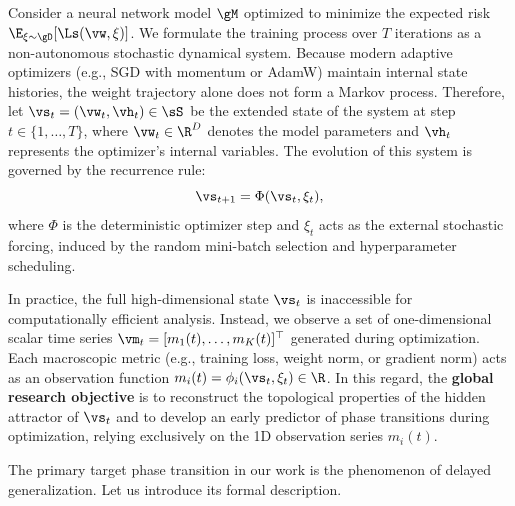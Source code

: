 \documentclass{article}
\begin{document}
Consider a neural network model $\gM$ optimized to minimize the expected risk $\E_{\xi \sim \gD}[\Ls(\vw, \xi)]$. We formulate the training process over $T$ iterations as a non-autonomous stochastic dynamical system. Because modern adaptive optimizers (e.g., SGD with momentum or AdamW) maintain internal state histories, the weight trajectory alone does not form a Markov process. Therefore, let $\vs_t = (\vw_t, \vh_t) \in \sS$ be the extended state of the system at step $t \in \{1, \dots, T\}$, where $\vw_t \in \R^D$ denotes the model parameters and $\vh_t$ represents the optimizer's internal variables. The evolution of this system is governed by the recurrence rule:
\begin{equation}
    \vs_{t+1} = \Phi(\vs_t, \xi_t),
\end{equation}
where $\Phi$ is the deterministic optimizer step and $\xi_t$ acts as the external stochastic forcing, induced by the random mini-batch selection and hyperparameter scheduling.

In practice, the full high-dimensional state $\vs_t$ is inaccessible for computationally efficient analysis. Instead, we observe a set of one-dimensional scalar time series $\vm_t =[m_1(t), \dots, m_K(t)]^\top$ generated during optimization. Each macroscopic metric (e.g., training loss, weight norm, or gradient norm) acts as an observation function $m_i(t) = \phi_i(\vs_t, \xi_t) \in \R$. In this regard, the \textbf{global research objective} is to reconstruct the topological properties of the hidden attractor of $\vs_t$ and to develop an early predictor of phase transitions during optimization, relying exclusively on the 1D observation series $m_i(t)$.

The primary target phase transition in our work is the phenomenon of delayed generalization. Let us introduce its formal description.
\end{document}
